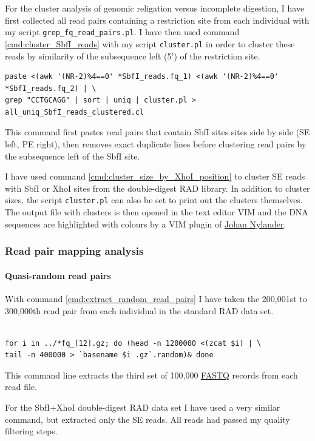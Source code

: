 \documentclass[a4paper,12pt,times,print,index,custombib,custommargin]{PhDThesisPSnPDF}\usepackage[]{graphicx}\usepackage[]{color}
\begin{document}
For the cluster analysis of genomic religation versus incomplete digestion, I have first collected all read pairs containing a restriction site from each individual with my script \texttt{grep\_fq\_read\_pairs.pl}. I have then used command \ref{cmd:cluster_SbfI_reads} with my script \texttt{cluster.pl} in order to cluster these reads by similarity of the subsequence left (5') of the restriction site. 
%
\begin{cmd}
\captionsetup{type=cmd}
\begin{Verbatim}[fontsize=\scriptsize, formatcom=\color{darkgray}]
paste <(awk '(NR-2)%4==0' *SbfI_reads.fq_1) <(awk '(NR-2)%4==0' *SbfI_reads.fq_2) | \
grep "CCTGCAGG" | sort | uniq | cluster.pl > all_uniq_SbfI_reads_clustered.cl
\end{Verbatim}
\caption{\small This command first pastes read pairs that contain SbfI sites sites side by side (SE left, PE right), then removes exact duplicate lines before clustering read pairs by the subsequence left of the SbfI site.}
\label{cmd:cluster_SbfI_reads}
\end{cmd}
%
I have used command \ref{cmd:cluster_size_by_XhoI_position} to cluster SE reads with SbfI or XhoI sites from the double-digest RAD library. In addition to cluster sizes, the script \texttt{cluster.pl} can also be set to print out the clusters themselves. The output file with clusters is then opened in the text editor VIM and the DNA sequences are highlighted with colours by a VIM plugin of \href{https://www.abc.se/~nylander/}{Johan Nylander}.

\FloatBarrier
\subsubsection{Read pair mapping analysis}\label{read_pair_mapping_analysis}

\paragraph{Quasi-random read pairs} 
With command \ref{cmd:extract_random_read_pairs} I have taken the 200,001st to 300,000th read pair from each individual in the standard RAD data set.
%
\begin{cmd}
\captionsetup{type=cmd}
\begin{Verbatim}[fontsize=\scriptsize, formatcom=\color{darkgray}]

for i in ../*fq_[12].gz; do (head -n 1200000 <(zcat $i) | \
tail -n 400000 > `basename $i .gz`.random)& done
\end{Verbatim}
\caption{\small This command line extracts the third set of 100,000 \href{http://en.wikipedia.org/wiki/FASTQ_format}{FASTQ} records from each read file.}
\label{cmd:extract_random_read_pairs}
\end{cmd}
%
For the SbfI$+$XhoI double-digest RAD data set I have used a very similar command, but extracted only the SE reads. All reads had passed my quality filtering steps.
\end{document}
